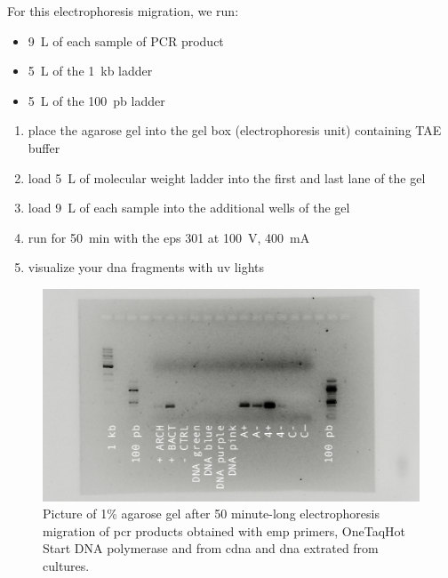 For this electrophoresis migration, we run:
\begin{itemize}
\item 9~\textmu L of each sample of PCR product 
\item 5~\textmu L of the 1~kb ladder
\item 5~\textmu L of the 100~pb ladder
\end{itemize}

\begin{enumerate}
\item place the agarose gel into the gel box (electrophoresis unit) containing TAE buffer
\item load 5~\textmu L of molecular weight ladder into the first and last lane of the gel
\item load 9~\textmu L of each sample into the additional wells of the gel
\item run for 50~min with the \gls{eps} 301 at 100~V, 400~mA
\item visualize your \gls{dna} fragments with \gls{uv} lights
\end{enumerate}

\begin{figure}[H] %
    \centering
    \caption{Picture of 1\% agarose gel after 50 minute-long electrophoresis migration of \gls{pcr} products obtained with \gls{emp} primers, OneTaq\cR Hot Start DNA polymerase and from \gls{cdna} and \gls{dna} extrated from cultures.}
    \label{fig:20180117_OneTaq_EMP_cDNA2}
    \includegraphics[width=\textwidth]{graphics/pic/20180117_OneTaq_EMP_cDNA2.png}
\end{figure}

